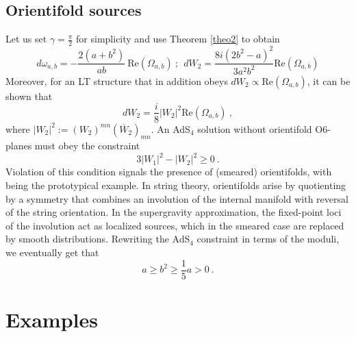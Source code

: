 \documentclass[12pt, reqno]{amsart}
\theoremstyle{definition}
\begin{document}
\subsection{Orientifold sources}\label{3.6}




Let us set $\gamma=\frac{\pi}{2}$ for simplicity and use Theorem \ref{theo2} to obtain
%
%
\[
d\omega_{a,b}= -\frac{2(a+b^2)}{ab}~\!\text{Re}(\Omega_{a,b})~;~~
d W_2=\frac{8i(2b^2-a)^2}{3a^2b^2}\text{Re}(\Omega_{a,b})
\]
%
Moreover, for an LT structure that in addition obeys $d W_2\propto \text{Re}(\Omega_{a,b})$, 
it can be shown that \cite{Lust_2005}
%
\[
d W_2=\frac{i}{8}|W_2|^2\text{Re}(\Omega_{a,b})
~,\]
% 
where $|W_2|^2:=(W_2)^{mn}(\overline{W}_2)_{mn}$. 
An AdS$_4$ solution without orientifold O6-planes must obey the constraint \cite{Koerber_2008} 
%
\[
3|W_1|^2-|W_2|^2\geq 0~.
\]
%
Violation of this condition signals the presence of (smeared) orientifolds, with \cite{DeWolfe_2005} being the prototypical example. In string theory, orientifolds arise by quotienting by a symmetry that combines an involution of the internal manifold with reversal of the string orientation. In the supergravity approximation, the fixed-point loci of the involution act as localized sources, which in the smeared case are replaced by smooth distributions. 
Rewriting the AdS$_4$ constraint in terms of the moduli, we eventually get that 
%
\[
a\geq b^2\geq\frac15 a>0
~.\]
%


\section{Examples}\label{4}
\end{document}
